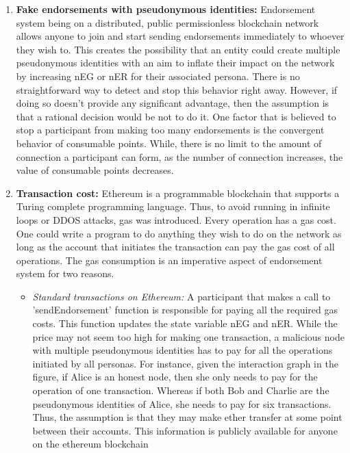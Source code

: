\begin{enumerate}
	\item \label{item:fakeeds} \textbf{Fake endorsements with pseudonymous
		identities:} Endorsement system being on a
		distributed, public permissionless blockchain network allows anyone to
		join and start sending endorsements immediately to whoever they wish
		to. This creates the possibility that an entity could create multiple
		pseudonymous identities with an aim to inflate their impact on the
		network by increasing nEG or nER for their associated persona.  There
		is no straightforward way to detect and stop this behavior right away.
		However, if doing so doesn't provide any significant advantage, then
		the assumption is that a rational decision would be not to do it.  One
		factor that is believed to stop a participant from making too many
		endorsements is the convergent behavior of consumable points. While,
		there is no limit to the amount of connection a participant can form,
		as the number of connection increases, the value of consumable points
		decreases. 
	\item \textbf{Transaction cost:} Ethereum is a programmable blockchain that
		supports a Turing complete programming language. Thus, to avoid running
		in infinite loops or DDOS attacks, gas was introduced. Every operation
		has a gas cost. One could write a program to do anything they wish to
		do on the network as long as the account that initiates the transaction
		can pay the gas cost of all operations. The gas consumption is an
		imperative aspect of endorsement system for two reasons. \\
		\begin{itemize}
			\item \textit{Standard transactions on Ethereum:} A participant
				that makes a call to 'sendEndorsement' function is responsible
				for paying all the required gas costs. This function updates
				the state variable nEG and nER. While the price may not seem
				too high for making one transaction, a malicious node with
				multiple pseudonymous identities has to pay for all the
				operations initiated by all personas. For instance, given the
				interaction graph in the figure, if Alice is an honest node,
				then she only needs to pay for the operation of one
				transaction. Whereas if both Bob and Charlie are the
				pseudonymous identities of Alice, she needs to pay for six
				transactions. Thus, the assumption is that they may make ether
				transfer at some point between their accounts. This information
				is publicly available for anyone on the ethereum blockchain

\end{itemize}
\end{enumerate}
